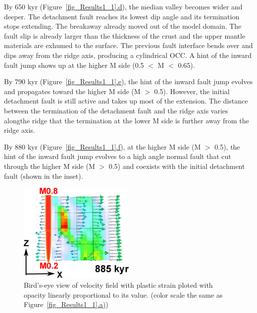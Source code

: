 By 650 kyr (Figure~\hyperref[fig_Results1_1]{\ref{fig_Results1_1}.d}), the median valley becomes wider and deeper. The detachment fault reaches its lowest dip angle and its termination stops extending. The breakaway already moved out of the model domain.
The fault slip is already larger than the thickness of the crust and the upper mantle materials are exhumed to the surface. The previous fault interface bends over and dips away from the ridge axis, producing a cylindrical OCC. A hint of the inward fault jump shows up at the higher M side (0.5 $<$ M $<$ 0.65).

By 790 kyr (Figure~\hyperref[fig_Results1_1]{\ref{fig_Results1_1}.e}), the hint of the inward fault jump evolves and propagates toward the higher M side (M $>$ 0.5). However, the initial detachment fault is still active and takes up most of the extension. The distance between the termination of the detachment fault and the ridge axis varies alongthe ridge that the termination at the lower M side is further away from the ridge axis.%

By 880 kyr (Figure~\hyperref[fig_Results1_1]{\ref{fig_Results1_1}.f}), at the higher M side (M $>$ 0.5), the hint of the inward fault jump evolves to a high angle normal fault that cut through the higher M side (M $>$ 0.5) and coexists with the initial detachment fault (shown in the inset). 

\begin{figure}[h]
  \centering
    \includegraphics[width=0.5\textwidth]{./Figures/fig_Results_1_velocity_field.eps}
  \caption{Bird's-eye view of velocity field with plastic strain ploted with opacity linearly proportional to its value. (color scale the same as Figure~\hyperref[fig_Results1_1]{\ref{fig_Results1_1}.a)})}
 \label{fig_Results_1_velocity_field}
\end{figure}


